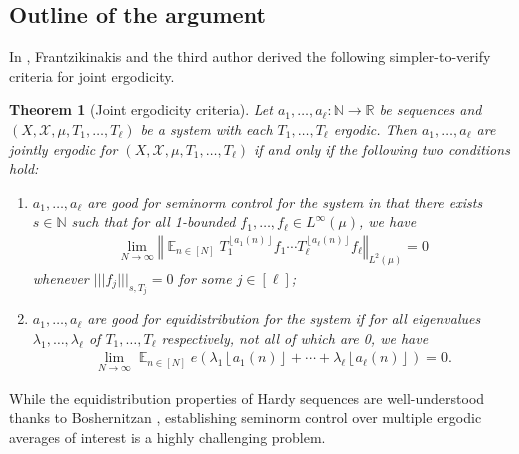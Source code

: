 \documentclass[11pt]{amsart}
\newtheorem{theorem}[lemma]{Theorem}
\theoremstyle{definition}
\DeclareMathOperator*{\E}{\mathbb{E}}
\newcommand{\N}{{\mathbb N}}
\newcommand{\R}{{\mathbb R}}
\newcommand{\CX}{{\mathcal X}}
\newcommand{\norm}[1]{\left\Vert #1\right\Vert}
\newcommand{\nnorm}[1]{\lvert\!|\!| #1|\!|\!\rvert}
\newcommand{\1}{{\mathbf{1}}}
\newcommand{\floor}[1]{{\left \lfloor #1 \right \rfloor}}
\begin{document}
\subsection{Outline of the argument}
In \cite[Theorem 2.5]{FrKu22a}, Frantzikinakis and the third author derived the following simpler-to-verify criteria for joint ergodicity. 
\begin{theorem}[Joint ergodicity criteria]\label{T: joint ergodicity criteria}
Let $a_1, \ldots, a_\ell:\N\to\R$ be sequences and $(X, \CX, \mu, T_1, \ldots, T_\ell)$ be a system with each $T_1, \ldots, T_\ell$ ergodic. Then $a_1, \ldots, a_\ell$ are jointly ergodic for  $(X, \CX, \mu, T_1, \ldots, T_\ell)$ if and only if the following two conditions hold:
    \begin{enumerate}
        \item $a_1, \ldots, a_\ell$ are \emph{good for seminorm control} for the system in that there exists $s\in\N$ such that for all 1-bounded $f_1, \ldots, f_\ell\in L^\infty(\mu)$, we have
    \begin{align*}%
        \lim_{N\to\infty}\norm{\E_{n\in[N]} T_1^{\floor{a_1(n)}}f_1 \cdots T_\ell^{\floor{a_\ell(n)}}f_\ell}_{L^2(\mu)} = 0
    \end{align*}
    whenever $\nnorm{f_j}_{s, T_j} = 0$ for some $j\in[\ell]$;
        \item $a_1, \ldots, a_\ell$ are \emph{good for equidistribution} for the system
        if for all eigenvalues $\lambda_1, \ldots, \lambda_\ell$ of $T_1, \ldots, T_\ell$ respectively, not all of which are 0, we have
        \begin{align}\label{E: good for equidistribution}
            \lim_{N\to\infty} \E_{n\in[N]}e(\lambda_1 \floor{a_1(n)} + \cdots + \lambda_\ell \floor{a_\ell(n)}) = 0.
        \end{align}
    \end{enumerate}
\end{theorem}
While the equidistribution properties of Hardy sequences are well-understood thanks to Boshernitzan \cite{Boshernitzan-equidistribution}, establishing seminorm control over multiple ergodic averages of interest is a highly challenging problem. 
\end{document}
